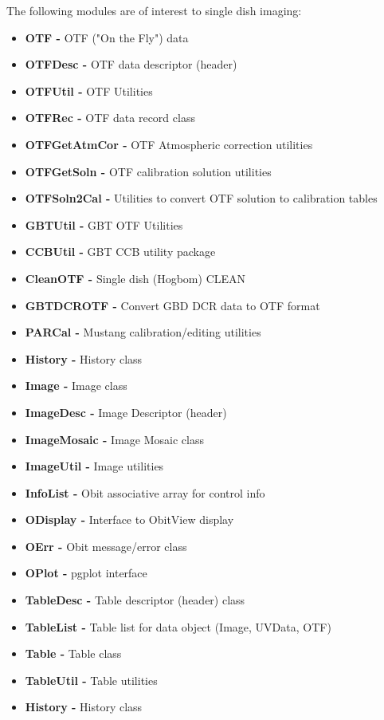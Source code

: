 \documentclass[11pt]{report}
\begin{document}
The following modules are of interest to single dish imaging:
\begin{itemize}
\item {\bf OTF - }            OTF ("On the Fly") data
\item {\bf OTFDesc - }        OTF data descriptor (header)
\item {\bf OTFUtil - }        OTF Utilities
\item {\bf OTFRec - }         OTF data record class
\item {\bf OTFGetAtmCor - }   OTF Atmospheric correction utilities
\item {\bf OTFGetSoln - }     OTF calibration solution utilities
\item {\bf OTFSoln2Cal - }    Utilities to convert OTF solution to calibration tables
\item {\bf GBTUtil - }        GBT OTF Utilities
\item {\bf CCBUtil - }        GBT CCB utility package
\item {\bf CleanOTF - }       Single dish (Hogbom) CLEAN
\item {\bf GBTDCROTF - }      Convert GBD DCR data to OTF format
\item {\bf PARCal - }         Mustang calibration/editing utilities
\item {\bf History - }        History class
\item {\bf Image - }          Image class
\item {\bf ImageDesc - }      Image Descriptor (header)
\item {\bf ImageMosaic - }    Image Mosaic class
\item {\bf ImageUtil - }      Image utilities
\item {\bf InfoList - }       Obit associative array for control info
\item {\bf ODisplay -  }      Interface to ObitView display
\item {\bf OErr - }           Obit message/error class
\item {\bf OPlot - }          pgplot interface
\item {\bf TableDesc - }      Table descriptor (header) class
\item {\bf TableList - }      Table list for data object (Image, UVData, OTF)
\item {\bf Table -  }         Table class
\item {\bf TableUtil - }      Table utilities
\item {\bf History - }        History class
\end{itemize}
\end{document}
